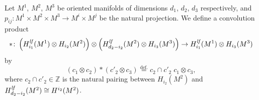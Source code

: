 \documentclass[12pt]{amsart}
\theoremstyle{definition}
\theoremstyle{remark}
\numberwithin{equation}{section}
\newcommand{\defeq}{\overset{\operatorname{\scriptstyle def.}}{=}}
\newcommand{\Hlf}{H^{\it lf}} %
\begin{document}
%
%
%

Let $M^1$, $M^2$, $M^3$ be oriented manifolds of dimensions $d_1$,
$d_2$, $d_3$ respectively, and
$p_{ij}\colon M^1\times M^2\times M^3 \to M^i\times M^j$ be the
natural projection.
We define a convolution product
\begin{equation*}
  \ast\colon \left(\Hlf_{i_1}(M^1)\otimes H_{i_2}(M^2)\right) \otimes
  \left(\Hlf_{d_2 - i_2}(M^2)\otimes H_{i_3}(M^3)\right) \to
  \Hlf_{i_1}(M^1)\otimes H_{i_3}(M^3)
\end{equation*}
by
\begin{equation*}
  (c_1\otimes c_2) \ast (c'_2\otimes c_3) \defeq
  c_2\cap c'_2\; c_1\otimes c_3,
\end{equation*}
where $c_2\cap c'_2\in\mathbb Z$ is the natural pairing between
$H_{i_2}(M^2)$ and $\Hlf_{d_2 - i_2}(M^2)\cong H^{i_2}(M^2)$.
\end{document}
